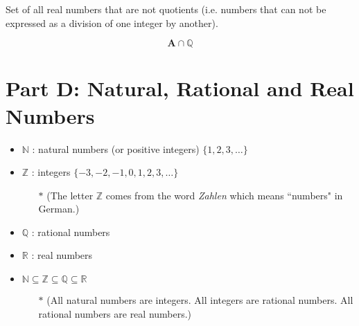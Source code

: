 \documentclass[11pt,a4paper,titlepage,oneside,openany]{article}
\numberwithin{equation}{section}
\numberwithin{algorithm}{section}
\numberwithin{figure}{section}
\numberwithin{table}{section}
\begin{document}
Set of all real numbers that are not quotients (i.e. numbers that can not be expressed as a division of one integer by another).





\[\boldsymbol{A} \cap \mathbb{Q}\]


\section*{Part D: Natural, Rational and Real Numbers}
\begin{framed}
\begin{itemize}
\item $\mathbb{N}$ : natural numbers (or positive integers) $\{1,2,3,\ldots\}$
\item $\mathbb{Z}$ : integers $\{-3,-2,-1,0,1,2,3,\ldots\}$
\begin{itemize}
\item[$\ast$] (The letter $\mathbb{Z}$ comes from the word \emph{Zahlen} which means ``numbers" in German.)
\end{itemize}
\item $\mathbb{Q}$ : rational numbers
\item $\mathbb{R}$ : real numbers
\item $\mathbb{N} \subseteq \mathbb{Z } \subseteq \mathbb{Q} \subseteq \mathbb{R}$
\begin{itemize}
\item[$\ast$] (All natural numbers are integers. All integers are rational numbers. All rational numbers are real numbers.)
\end{itemize}
\end{itemize}
\end{framed}
\end{document}
